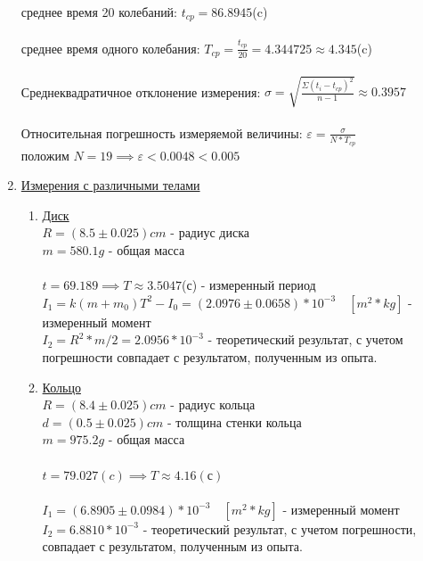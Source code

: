 \documentclass[12pt]{article}
\begin{document}
\begin{enumerate}
            среднее время 20 колебаний: $t_{cp} = 86.8945$(c) \\ \\
            среднее время одного колебания: $T_{cp} = \frac{t_{cp}}{20} = 4.344725 \approx 4.345$(c) \\ \\ 
            Среднеквадратичное отклонение измерения:
            $\sigma = \sqrt{\frac{\Sigma (t_i - t_{cp})^2 }{n-1}} \approx 0.3957$ \\ \\
            Относительная погрешность измеряемой величины: $\varepsilon = \frac{\sigma}{N* T_{cp}}$ \\ 
            положим $N = 19 \implies \varepsilon < 0.0048 < 0.005$ \\ 
        \item \underline{Измерения с различными телами}
            \begin{enumerate} 
                \item \underline{Диск} \\
                    $R = (8.5 \pm 0.025)cm$  - радиус диска \\ 
                    $m = 580.1 g$ - общая масса\\ \\
                    $t = 69.189 \implies T \approx 3.5047$(с) - измеренный период \\
                     
                    $I_1 = k(m + m_0)T^2 - I_0 = (2.0976 \pm 0.0658) * 10 ^ {-3} \quad [m^2 * kg]$ - измеренный момент \\
                    $I_2 = R^2 * m/ 2 = 2.0956 * 10^{-3}$ - теоретический результат, с учетом погрешности совпадает с результатом, полученным из опыта.
                    

                \item \underline{Кольцо} \\
                    $R = (8.4 \pm 0.025)cm$  - радиус кольца \\ 
                    $d = (0.5 \pm 0.025)cm$ - толщина стенки кольца  \\
                    $m = 975.2 g$ - общая масса\\ \\
                    $t = 79.027(c) \implies T \approx 4.16(с)$ \\ \\ 
                    $I_1 = (6.8905 \pm 0.0984) * 10^{-3} \quad [m^2 * kg]$ - измеренный момент
                    $I_2 = 6.8810 * 10 ^ {-3}$ - теоретический результат, с учетом погрешности, совпадает с результатом, полученным из опыта.


\end{enumerate}
\end{enumerate}
\end{document}
